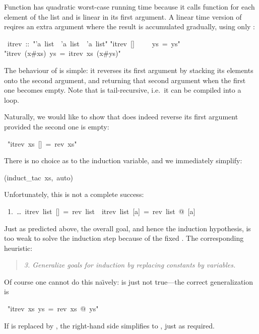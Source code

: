 \begin{isabelle}%
%
\begin{isamarkuptext}%
Function  has quadratic worst-case running time
because it calls function \isa{\at} for each element of the list and
\isa{\at} is linear in its first argument.  A linear time version of
 reqires an extra argument where the result is accumulated
gradually, using only \isa{\#}:%
\end{isamarkuptext}%
~itrev~::~{"}'a~list~{\isasymRightarrow}~'a~list~{\isasymRightarrow}~'a~list{"}\isanewline
{}\isanewline
{"}itrev~[]~~~~~ys~=~ys{"}\isanewline
{"}itrev~(x\#xs)~ys~=~itrev~xs~(x\#ys){"}%
\begin{isamarkuptext}%
\noindent The behaviour of  is simple: it reverses
its first argument by stacking its elements onto the second argument,
and returning that second argument when the first one becomes
empty. Note that  is tail-recursive, i.e.\ it can be
compiled into a loop.

Naturally, we would like to show that  does indeed reverse
its first argument provided the second one is empty:%
\end{isamarkuptext}%
~{"}itrev~xs~[]~=~rev~xs{"}%
\begin{isamarkuptxt}%
\noindent
There is no choice as to the induction variable, and we immediately simplify:%
\end{isamarkuptxt}%
(induct\_tac~xs,~auto)%
\begin{isamarkuptxt}%
\noindent
Unfortunately, this is not a complete success:
\begin{isabellepar}%
~1.~\dots~itrev~list~[]~=~rev~list~{\isasymLongrightarrow}~itrev~list~[a]~=~rev~list~@~[a]%
\end{isabellepar}%
Just as predicted above, the overall goal, and hence the induction
hypothesis, is too weak to solve the induction step because of the fixed
\isa{[]}. The corresponding heuristic:
\begin{quote}
{\em 3. Generalize goals for induction by replacing constants by variables.}
\end{quote}

Of course one cannot do this na\"{\i}vely:  is
just not true---the correct generalization is%
\end{isamarkuptxt}%
~{"}itrev~xs~ys~=~rev~xs~@~ys{"}%
\begin{isamarkuptxt}%
\noindent
If  is replaced by \isa{[]}, the right-hand side simplifies to
, just as required.


\end{isamarkuptxt}
\end{isabelle}
